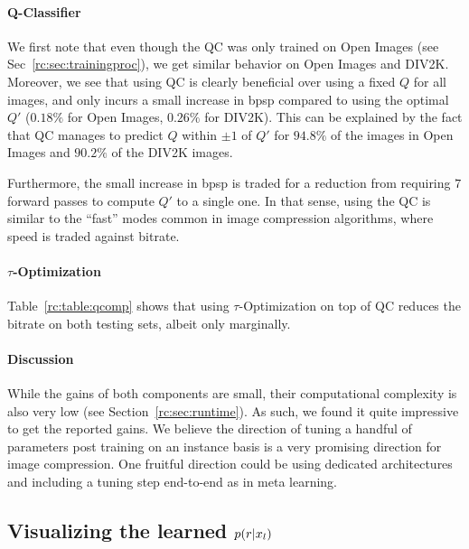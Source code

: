 \paragraph{Q-Classifier} We first note that even though the QC was only trained on Open Images (see Sec~\ref{rc:sec:trainingproc}), we get similar behavior on Open Images and DIV2K. 
Moreover, we see that using QC is clearly beneficial over using a fixed $Q$ for all images, and 
only incurs a small increase in bpsp compared to using the optimal $Q'$
%
($0.18\%$ for Open Images, $0.26\%$ for DIV2K). This can be explained by the fact that QC manages to predict $Q$ within $\pm1$ of $Q'$ for 
$94.8\%$ of the images in Open Images and $90.2\%$ of the DIV2K images. 

Furthermore, the small increase in bpsp is traded for a reduction from requiring $7$ forward passes to compute $Q'$ to a single one. In that sense, using the QC is similar to the ``fast'' modes common in image compression algorithms, where speed is traded against bitrate.

\paragraph{$\tau$-Optimization} Table~\ref{rc:table:qcomp} shows that using $\tau$-Optimization on top of QC reduces the bitrate on both testing sets, albeit only marginally. 

\paragraph{Discussion} While the gains of both components are small, their computational complexity is also very low (see Section~\ref{rc:sec:runtime}).
As such, we found it quite impressive to get the reported gains. We believe the direction of tuning a handful of parameters post training on an instance basis is a very promising direction for image compression. One fruitful direction could be using dedicated architectures and including a tuning step end-to-end as in meta learning.

\subsection{Visualizing the learned $p(r|x_l)$}
\label{rc:sec:visualizesamples}


